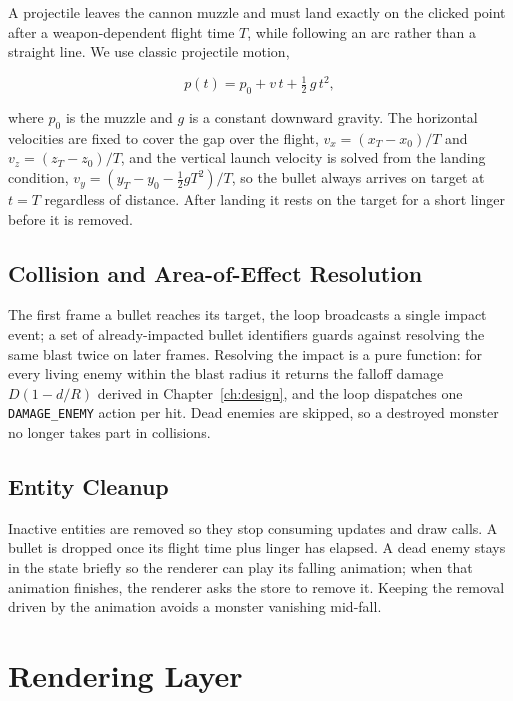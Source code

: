 \documentclass[12pt,a4paper]{report}
\begin{document}
A projectile leaves the cannon muzzle and must land exactly on the clicked point
after a weapon-dependent flight time $T$, while following an arc rather than a
straight line. We use classic projectile motion,

\begin{equation}
p(t) = p_0 + v\,t + \tfrac{1}{2}\,g\,t^2,
\end{equation}

where $p_0$ is the muzzle and $g$ is a constant downward gravity. The horizontal
velocities are fixed to cover the gap over the flight, $v_x=(x_T-x_0)/T$ and
$v_z=(z_T-z_0)/T$, and the vertical launch velocity is solved from the landing
condition, $v_y=(y_T-y_0-\tfrac12 g T^2)/T$, so the bullet always arrives on
target at $t=T$ regardless of distance. After landing it rests on the target for
a short linger before it is removed.

\subsection{Collision and Area-of-Effect Resolution}

The first frame a bullet reaches its target, the loop broadcasts a single impact
event; a set of already-impacted bullet identifiers guards against resolving the
same blast twice on later frames. Resolving the impact is a pure function: for
every living enemy within the blast radius it returns the falloff damage
$D(1-d/R)$ derived in Chapter~\ref{ch:design}, and the loop dispatches one
\texttt{DAMAGE\_ENEMY} action per hit. Dead enemies are skipped, so a destroyed
monster no longer takes part in collisions.

\subsection{Entity Cleanup}

Inactive entities are removed so they stop consuming updates and draw calls. A
bullet is dropped once its flight time plus linger has elapsed. A dead enemy
stays in the state briefly so the renderer can play its falling animation; when
that animation finishes, the renderer asks the store to remove it. Keeping the
removal driven by the animation avoids a monster vanishing mid-fall.

\section{Rendering Layer}
\end{document}
